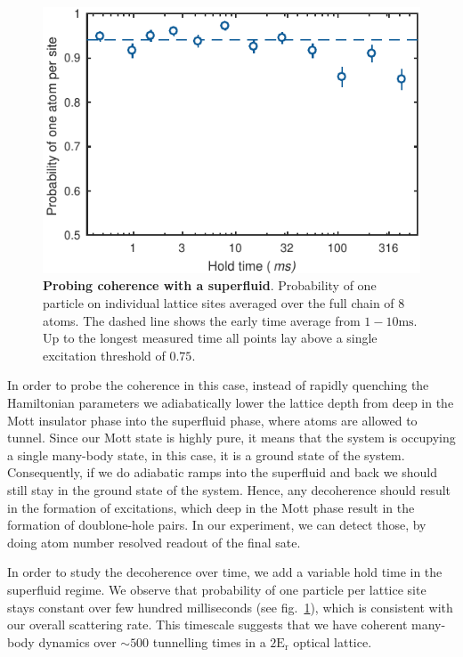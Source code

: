 \begin{figure}[t]
	\centering
	\includegraphics[scale=1]{figures/CBH_melt_and_back_p1.pdf}
	\caption{{\bf Probing coherence with a superfluid}. Probability of one particle on individual lattice sites averaged over the full chain of $8$ atoms. The dashed line shows the early time average from $1-10\mathrm{ms}$. Up to the longest measured time all points lay above a single excitation threshold of $0.75$.} 
	\label{fig:CBH_melt_and_back}
\end{figure}

In order to probe the coherence in this case, instead of rapidly quenching the Hamiltonian parameters we adiabatically lower the lattice depth from deep in the Mott insulator phase into the superfluid phase, where atoms are allowed to tunnel. Since our Mott state is highly pure, it means that the system is occupying a single many-body state, in this case, it is a ground state of the system. Consequently, if we do adiabatic ramps into the superfluid and back we should still stay in the ground state of the system. Hence, any decoherence should result in the formation of excitations, which deep in the Mott phase result in the formation of doublone-hole pairs. In our experiment, we can detect those, by doing atom number resolved readout of the final sate.

In order to study the decoherence over time, we add a variable hold time in the superfluid regime. We observe that probability of one particle per lattice site stays constant over few hundred milliseconds (see fig.~\ref{fig:CBH_melt_and_back}), which is consistent with our overall scattering rate. This timescale suggests that we have coherent many-body dynamics over $\sim 500$ tunnelling times in a $2\mathrm{E_r}$ optical lattice.